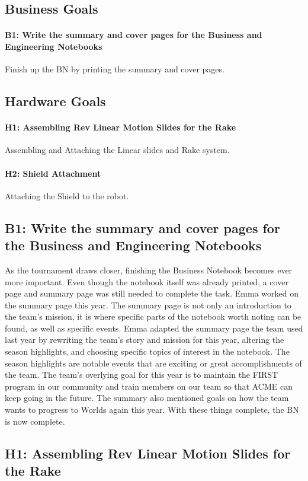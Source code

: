 \documentclass{article}
\begin{document}
\subsection{Business Goals}
\paragraph{B1: Write the summary and cover pages for the Business and Engineering Notebooks}
 Finish up the BN by printing the summary and cover pages.
\subsection{Hardware Goals}
\paragraph{H1: Assembling Rev Linear Motion Slides for the Rake}
 Assembling and Attaching the Linear slides and Rake system.
\paragraph{H2: Shield Attachment}
Attaching the Shield to the robot.
\newpage
\subsection{B1: Write the summary and cover pages for the Business and Engineering Notebooks}

As the tournament draws closer, finishing the Business Notebook becomes ever more important. Even though the notebook itself was already printed, a cover page and summary page was still needed to complete the task. Emma worked on the summary page this year. The summary page is not only an introduction to the team's mission, it is where specific parts of the notebook worth noting can be found, as well as specific events. Emma adapted the summary page the team used last year by rewriting the team's story and mission for this year, altering the season highlights, and choosing specific topics of interest in the notebook. The season highlights are notable events that are exciting or great accomplishments of the team. The team's overlying goal for this year is to maintain the FIRST program in our community and train members on our team so that ACME can keep going in the future. The summary also mentioned goals on how the team wants to progress to Worlds again this year. With these things complete, the BN is now complete.  


\subsection{H1: Assembling Rev Linear Motion Slides for the Rake}
\end{document}
